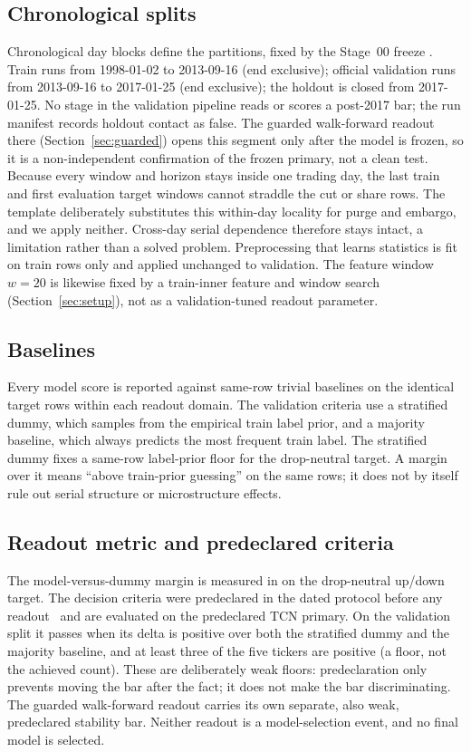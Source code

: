 \subsection{Chronological splits}

Chronological day blocks define the partitions, fixed by the Stage~00 freeze
\cite{hyndman2021forecasting}. Train runs from 1998-01-02 to 2013-09-16
(end exclusive); official validation runs from 2013-09-16 to 2017-01-25
(end exclusive); the holdout is closed from 2017-01-25. No stage in the
validation pipeline reads or scores a post-2017 bar; the run manifest records
holdout contact as false. The guarded walk-forward readout there
(Section~\ref{sec:guarded}) opens this segment only after the model is frozen, so
it is a non-independent confirmation of the frozen primary, not a clean test. Because
every window and horizon stays inside one trading day, the last train and first
evaluation target windows cannot straddle the cut or share rows. The template
deliberately substitutes this within-day locality for purge and embargo, and we
apply neither. Cross-day serial dependence therefore stays intact, a limitation
rather than a solved problem. Preprocessing that learns statistics is fit on train
rows only and applied unchanged to validation. The feature window \(w = 20\) is likewise fixed by a
train-inner feature and window search (Section~\ref{sec:setup}), not as a
validation-tuned readout parameter.

\subsection{Baselines}

Every model score is reported against same-row trivial baselines on the identical
target rows within each readout domain. The validation criteria use a stratified
dummy, which samples from the empirical train label prior, and a majority
baseline, which always predicts the most frequent train label. The stratified
dummy fixes a same-row label-prior \macrofone{} floor for the drop-neutral
target. A margin over it means ``above train-prior guessing'' on the same rows;
it does not by itself rule out serial structure or microstructure effects.

\subsection{Readout metric and predeclared criteria}

The model-versus-dummy margin is measured in \macrofone{} on the drop-neutral
up/down target. The decision criteria were predeclared in the dated protocol
before any readout~\cite{hofman2023preregistration} and are evaluated on the predeclared TCN
primary. On the validation split it passes
when its \macrofone{} delta is positive over both the stratified dummy and the
majority baseline, and at least three of the five tickers are positive (a floor,
not the achieved count). These are deliberately weak floors: predeclaration only
prevents moving the bar after the fact; it does not make the bar discriminating.
The guarded walk-forward readout carries its own separate, also weak, predeclared
stability bar. Neither readout is a model-selection event, and no final model is
selected.

